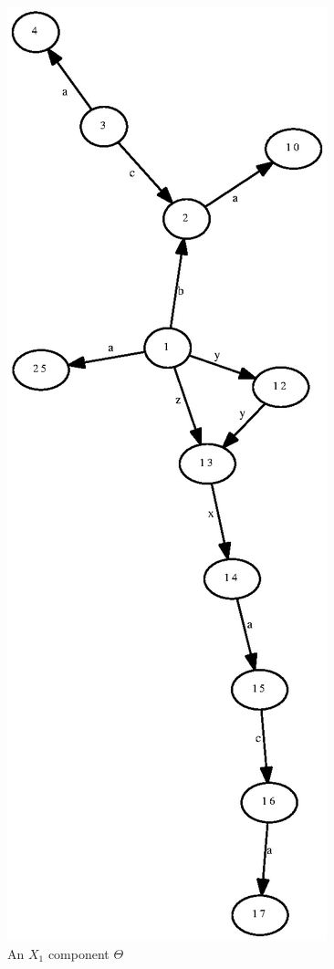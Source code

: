 \documentclass[a4paper,12pt]{article}
\numberwithin{equation}{section}
\numberwithin{figure}{section}
\begin{document}
\begin{figure}
\begin{center}
\includegraphics[scale=0.5, angle=90,bb=0 0 300 600]{python/ex_K_X.eps}
\caption{An $X_1$ component $\Theta$}
\label{fig:KX}
\end{center}
\end{figure}
\end{document}
